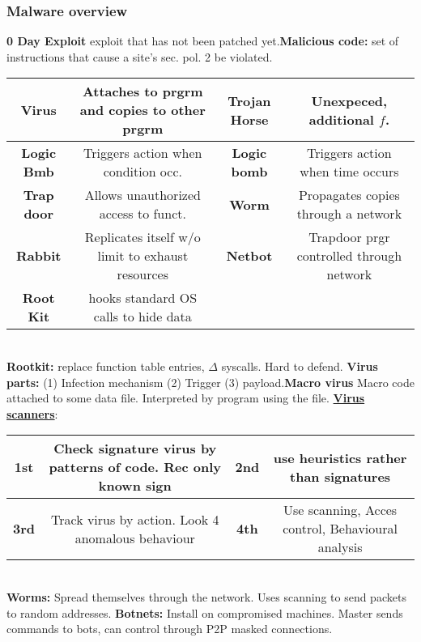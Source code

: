 \documentclass[a4paper,1pt]{article}
\begin{document}
\subsubsection{Malware overview}
{\bf 0 Day Exploit} exploit that has not been patched yet.{\bf Malicious code:} set of instructions that cause a site's sec. pol. 2 be violated. \\
\begin{tabular}{| c | c | c | c|}
  \hline
 {\bf Virus} & Attaches to prgrm and copies to other prgrm & {\bf Trojan Horse} & Unexpeced, additional $f$. \\
  \hline
  {\bf Logic Bmb} & Triggers action when condition occ. & {\bf Logic bomb} & Triggers action when time occurs \\
  \hline
  {\bf Trap door} & Allows unauthorized access to funct. & {\bf Worm} & Propagates copies through a network \\
  \hline
  {\bf Rabbit} & Replicates itself w/o limit to exhaust resources & {\bf Netbot} & Trapdoor prgr controlled through network \\
  \hline
  {\bf Root Kit} & hooks standard OS calls to hide data & & \\
  \hline
\end{tabular}\\
{\bf Rootkit:} replace function table entries, $\Delta$ syscalls. Hard to defend. {\bf Virus parts:} (1) Infection mechanism (2) Trigger (3) payload.{\bf Macro virus} Macro code attached to some data file. Interpreted by program using the file. {\bf \underline{Virus scanners}}:\\
\begin{tabular}{|c | c | c | c |}
 \hline
 {\bf 1st} & Check signature virus by patterns of code. Rec only known sign & {\bf 2nd} & use heuristics rather than signatures \\
 \hline
 {\bf 3rd } & Track virus by action. Look 4 anomalous behaviour & {\bf 4th } & Use scanning, Acces control, Behavioural analysis \\
 \hline
\end{tabular}\\
{\bf Worms:} Spread themselves through the network. Uses scanning to send packets to random addresses. {\bf Botnets:} Install on compromised machines. Master sends commands to bots, can control through P2P masked connections.
\end{document}
